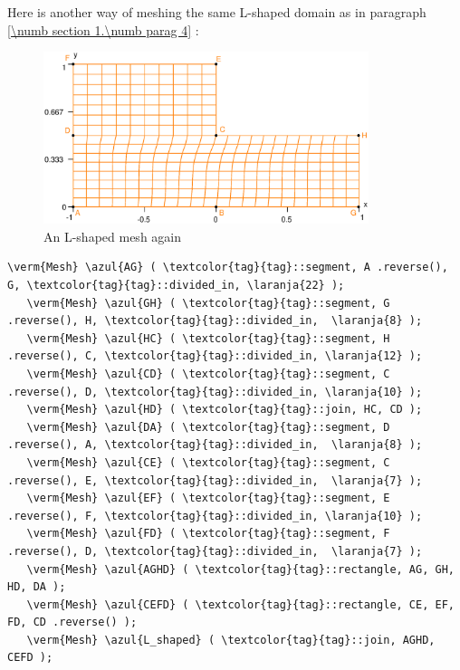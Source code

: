 Here is another way of meshing the same L-shaped domain as in paragraph
\ref{\numb section 1.\numb parag 4} :

\begin{figure}[ht] \centering
  \includegraphics[width=95mm]{L-shaped-distorted}
  \caption{An L-shaped mesh again}
  \label{\numb section 2.\numb fig 1}
\end{figure}

\begin{Verbatim}[commandchars=\\\{\},formatcom=\small\tt,frame=single,
   label=parag-\ref{\numb section 2.\numb parag 1}.cpp,rulecolor=\color{coment},
   baselinestretch=0.94,framesep=2mm]
   \verm{Mesh} \azul{AG} ( \textcolor{tag}{tag}::segment, A .reverse(), G, \textcolor{tag}{tag}::divided_in, \laranja{22} );
   \verm{Mesh} \azul{GH} ( \textcolor{tag}{tag}::segment, G .reverse(), H, \textcolor{tag}{tag}::divided_in,  \laranja{8} );
   \verm{Mesh} \azul{HC} ( \textcolor{tag}{tag}::segment, H .reverse(), C, \textcolor{tag}{tag}::divided_in, \laranja{12} );
   \verm{Mesh} \azul{CD} ( \textcolor{tag}{tag}::segment, C .reverse(), D, \textcolor{tag}{tag}::divided_in, \laranja{10} );
   \verm{Mesh} \azul{HD} ( \textcolor{tag}{tag}::join, HC, CD );
   \verm{Mesh} \azul{DA} ( \textcolor{tag}{tag}::segment, D .reverse(), A, \textcolor{tag}{tag}::divided_in,  \laranja{8} );
   \verm{Mesh} \azul{CE} ( \textcolor{tag}{tag}::segment, C .reverse(), E, \textcolor{tag}{tag}::divided_in,  \laranja{7} );
   \verm{Mesh} \azul{EF} ( \textcolor{tag}{tag}::segment, E .reverse(), F, \textcolor{tag}{tag}::divided_in, \laranja{10} );
   \verm{Mesh} \azul{FD} ( \textcolor{tag}{tag}::segment, F .reverse(), D, \textcolor{tag}{tag}::divided_in,  \laranja{7} );
   \verm{Mesh} \azul{AGHD} ( \textcolor{tag}{tag}::rectangle, AG, GH, HD, DA );
   \verm{Mesh} \azul{CEFD} ( \textcolor{tag}{tag}::rectangle, CE, EF, FD, CD .reverse() );
   \verm{Mesh} \azul{L_shaped} ( \textcolor{tag}{tag}::join, AGHD, CEFD );
\end{Verbatim}

